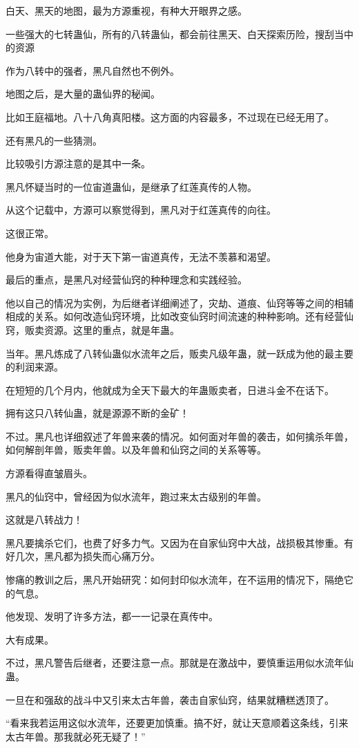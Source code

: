 \begin{this_body}
白天、黑天的地图，最为方源重视，有种大开眼界之感。

一些强大的七转蛊仙，所有的八转蛊仙，都会前往黑天、白天探索历险，搜刮当中的资源

作为八转中的强者，黑凡自然也不例外。

地图之后，是大量的蛊仙界的秘闻。

比如王庭福地。八十八角真阳楼。这方面的内容最多，不过现在已经无用了。

还有黑凡的一些猜测。

比较吸引方源注意的是其中一条。

黑凡怀疑当时的一位宙道蛊仙，是继承了红莲真传的人物。

从这个记载中，方源可以察觉得到，黑凡对于红莲真传的向往。

这很正常。

他身为宙道大能，对于天下第一宙道真传，无法不羡慕和渴望。

最后的重点，是黑凡对经营仙窍的种种理念和实践经验。

他以自己的情况为实例，为后继者详细阐述了，灾劫、道痕、仙窍等等之间的相辅相成的关系。如何改造仙窍环境，比如改变仙窍时间流速的种种影响。还有经营仙窍，贩卖资源。这里的重点，就是年蛊。

当年。黑凡炼成了八转仙蛊似水流年之后，贩卖凡级年蛊，就一跃成为他的最主要的利润来源。

在短短的几个月内，他就成为全天下最大的年蛊贩卖者，日进斗金不在话下。

拥有这只八转仙蛊，就是源源不断的金矿！

不过。黑凡也详细叙述了年兽来袭的情况。如何面对年兽的袭击，如何擒杀年兽，如何解剖年兽，贩卖年兽。以及年兽和仙窍之间的关系等等。

方源看得直皱眉头。

黑凡的仙窍中，曾经因为似水流年，跑过来太古级别的年兽。

这就是八转战力！

黑凡要擒杀它们，也费了好多力气。又因为在自家仙窍中大战，战损极其惨重。有好几次，黑凡都为损失而心痛万分。

惨痛的教训之后，黑凡开始研究：如何封印似水流年，在不运用的情况下，隔绝它的气息。

他发现、发明了许多方法，都一一记录在真传中。

大有成果。

不过，黑凡警告后继者，还要注意一点。那就是在激战中，要慎重运用似水流年仙蛊。

一旦在和强敌的战斗中又引来太古年兽，袭击自家仙窍，结果就糟糕透顶了。

“看来我若运用这似水流年，还要更加慎重。搞不好，就让天意顺着这条线，引来太古年兽。那我就必死无疑了！”


\end{this_body}
